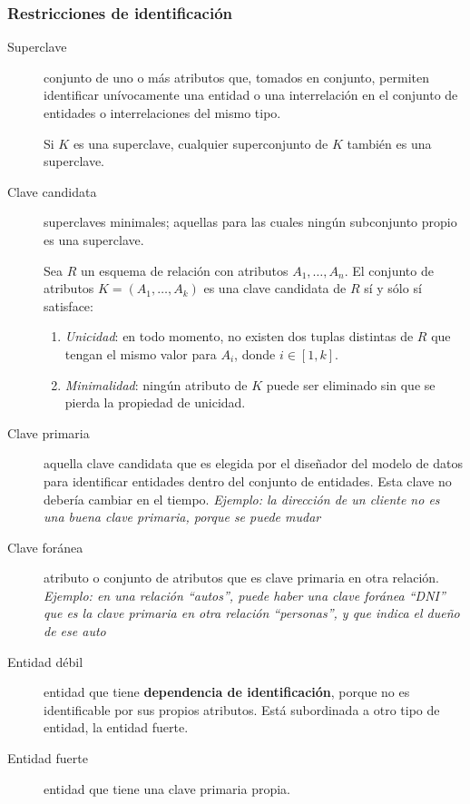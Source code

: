 \documentclass[a4paper, twoside]{article}
\begin{document}
\subsubsection{Restricciones de identificación}
\begin{description}
	\item[Superclave] conjunto de uno o más atributos que, tomados en conjunto, permiten identificar unívocamente una entidad o una interrelación en el conjunto de entidades o interrelaciones del mismo tipo.

	Si $K$ es una superclave, cualquier superconjunto de $K$ también es una superclave.

	\item[Clave candidata] superclaves minimales; aquellas para las cuales ningún subconjunto propio es una superclave.

	Sea $R$ un esquema de relación con atributos $A_{1},\dots,A_{n}$. El conjunto de atributos $K=\left(A_{1},\dots,A_{k}\right)$ es una clave candidata de $R$ sí y sólo sí satisface:
	\begin{enumerate}
		\item \emph{Unicidad}: en todo momento, no existen dos tuplas distintas de $R$ que tengan el mismo valor para $A_{i}$, donde $i\in[1,k]$.
		\item \emph{Minimalidad}: ningún atributo de $K$ puede ser eliminado sin que se pierda la propiedad de unicidad.
	\end{enumerate}

	\item[Clave primaria] aquella clave candidata que es elegida por el diseñador del modelo de datos para identificar entidades dentro del conjunto de entidades. Esta clave no debería cambiar en el tiempo. \emph{Ejemplo: la dirección de un cliente no es una buena clave primaria, porque se puede mudar}

	\item[Clave foránea] atributo o conjunto de atributos que es clave primaria en otra relación. \emph{Ejemplo: en una relación ``autos'', puede haber una clave foránea ``DNI'' que es la clave primaria en otra relación ``personas'', y que indica el dueño de ese auto}

	\item[Entidad débil] entidad que tiene \textbf{dependencia de identificación}, porque no es identificable por sus propios atributos. Está subordinada a otro tipo de entidad, la entidad fuerte.

	\item[Entidad fuerte] entidad que tiene una clave primaria propia.


\end{description}
\end{document}
